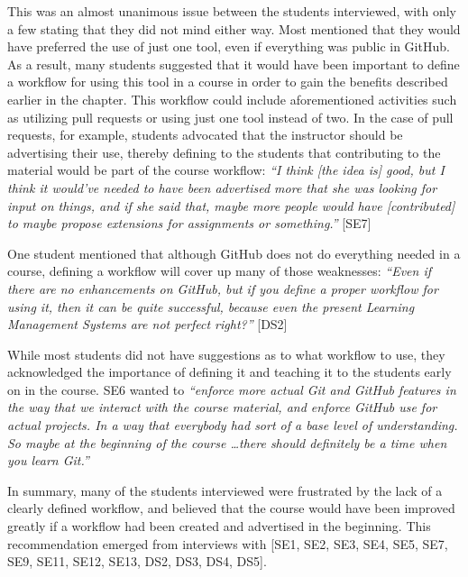 This was an almost unanimous issue between the students interviewed, with only a few stating that they did not mind either way. Most mentioned that they would have preferred the use of just one tool, even if everything was public in GitHub. As a result, many students suggested that it would have been important to define a workflow for using this tool in a course in order to gain the benefits described earlier in the chapter. This workflow could include aforementioned activities such as utilizing pull requests or using just one tool instead of two. In the case of pull requests, for example, students advocated that the instructor should be advertising their use, thereby defining to the students that contributing to the material would be part of the course workflow: \textit{``I think [the idea is] good, but I think it would've needed to have been advertised more that she was looking for input on things, and if she said that, maybe more people would have [contributed] to maybe propose extensions for assignments or something.''} [SE7]

One student mentioned that although GitHub does not do everything needed in a course, defining a workflow will cover up many of those weaknesses: \textit{``Even if there are no enhancements on GitHub, but if you define a proper workflow for using it, then it can be quite successful, because even the present Learning Management Systems are not perfect right?''} [DS2]

While most students did not have suggestions as to what workflow to use, they acknowledged the importance of defining it and teaching it to the students early on in the course. SE6 wanted to \textit{``enforce more actual Git and GitHub features in the way that we interact with the course material, and enforce GitHub use for actual projects. In a way that everybody had sort of a base level of understanding. So maybe at the beginning of the course \ldots there should definitely be a time when you learn Git.''}

In summary, many of the students interviewed were frustrated by the lack of a clearly defined workflow, and believed that the course would have been improved greatly if a workflow had been created and advertised in the beginning. This recommendation emerged from interviews with [SE1, SE2, SE3, SE4, SE5, SE7, SE9, SE11, SE12, SE13, DS2, DS3, DS4, DS5].


